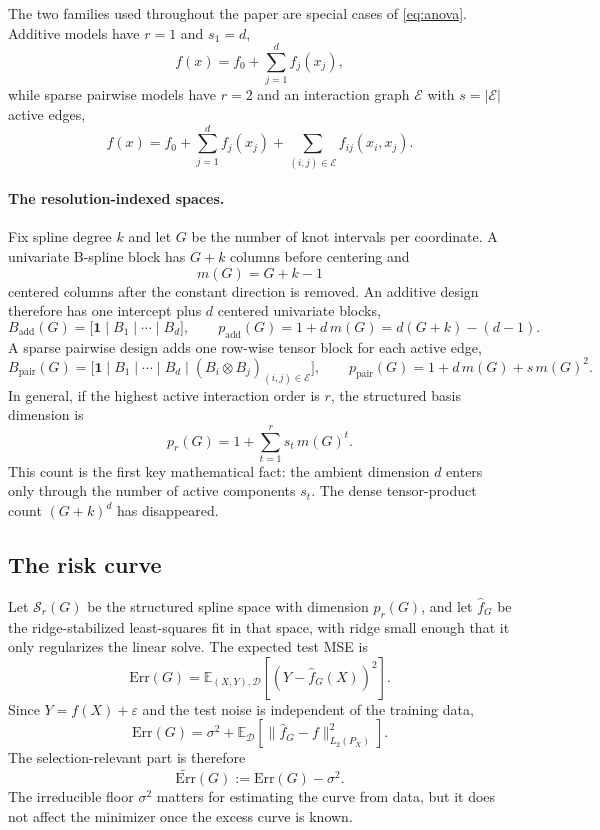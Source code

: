 \documentclass{article}
\newcommand{\EE}{\mathbb{E}}
\newcommand{\Err}{\mathrm{Err}}
\newcommand{\add}{\mathrm{add}}
\newcommand{\pair}{\mathrm{pair}}
\begin{document}
The two families used throughout the paper are special cases of \eqref{eq:anova}. Additive models have $r=1$ and $s_1=d$,
\[
    f(x)=f_0+\sum_{j=1}^d f_j(x_j),
\]
while sparse pairwise models have $r=2$ and an interaction graph $\mathcal{E}$ with $s=|\mathcal{E}|$ active edges,
\[
    f(x)=f_0+\sum_{j=1}^d f_j(x_j)+\sum_{(i,j)\in\mathcal{E}} f_{ij}(x_i,x_j).
\]

\paragraph{The resolution-indexed spaces.}
Fix spline degree $k$ and let $G$ be the number of knot intervals per coordinate. A univariate B-spline block has $G+k$ columns before centering and
\begin{equation}
    m(G)=G+k-1
    \label{eq:mG}
\end{equation}
centered columns after the constant direction is removed. An additive design therefore has one intercept plus $d$ centered univariate blocks,
\[
    B_{\add}(G)=\bigl[\mathbf{1}\mid B_1\mid\cdots\mid B_d\bigr],
    \qquad
    p_{\add}(G)=1+d\,m(G)=d(G+k)-(d-1).
\]
A sparse pairwise design adds one row-wise tensor block for each active edge,
\[
    B_{\pair}(G)=\bigl[\mathbf{1}\mid B_1\mid\cdots\mid B_d\mid (B_i\otimes B_j)_{(i,j)\in\mathcal{E}}\bigr],
    \qquad
    p_{\pair}(G)=1+d\,m(G)+s\,m(G)^2.
\]
In general, if the highest active interaction order is $r$, the structured basis dimension is
\begin{equation}
    p_r(G)=1+\sum_{t=1}^{r}s_t\,m(G)^t.
    \label{eq:prg}
\end{equation}
This count is the first key mathematical fact: the ambient dimension $d$ enters only through the number of active components $s_t$. The dense tensor-product count $(G+k)^d$ has disappeared.

\subsection{The risk curve}
\label{sec:closed_form}

Let $\mathcal{S}_r(G)$ be the structured spline space with dimension $p_r(G)$, and let $\hat f_G$ be the ridge-stabilized least-squares fit in that space, with ridge small enough that it only regularizes the linear solve. The expected test MSE is
\begin{equation}
    \Err(G)=\EE_{(X,Y),\mathcal{D}}\!\left[(Y-\hat f_G(X))^2\right].
    \label{eq:test_err}
\end{equation}
Since $Y=f(X)+\varepsilon$ and the test noise is independent of the training data,
\begin{equation}
    \Err(G)=\sigma^2+\EE_{\mathcal{D}}\!\left[\|\hat f_G-f\|_{L_2(P_X)}^2\right].
    \label{eq:bvd}
\end{equation}
The selection-relevant part is therefore
\begin{equation}
    \widetilde{\Err}(G):=\Err(G)-\sigma^2.
    \label{eq:selection_err}
\end{equation}
The irreducible floor $\sigma^2$ matters for estimating the curve from data, but it does not affect the minimizer once the excess curve is known.
\end{document}
